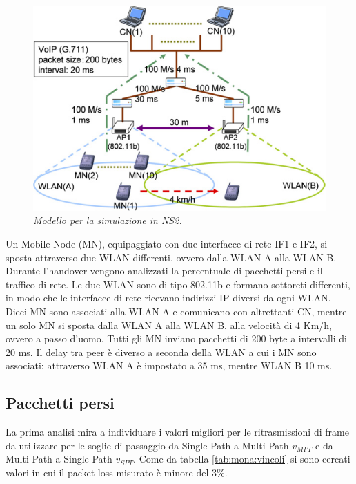 \documentclass[12pt,a4paper,openright,twoside]{book}
\begin{document}
\begin{figure}
  \centering
  \includegraphics[width=\textwidth]{img/mona-qos-sim-model}
  \caption{\em Modello per la simulazione in NS2.}
  \label{fig:mona:qos-sim-model}
\end{figure}

Un Mobile Node (MN), equipaggiato con due interfacce di rete IF1 e
IF2, si sposta attraverso due WLAN differenti, ovvero dalla WLAN A
alla WLAN B. Durante l'handover vengono analizzati la percentuale di
pacchetti persi e il traffico di rete. Le due WLAN sono di tipo
802.11b e formano sottoreti differenti, in modo che le interfacce di
rete ricevano indirizzi IP diversi da ogni WLAN. Dieci MN sono
associati alla WLAN A e comunicano con altrettanti CN, mentre un solo
MN si sposta dalla WLAN A alla WLAN B, alla velocità di 4 Km/h, ovvero
a passo d'uomo. Tutti gli MN inviano pacchetti di 200 byte a
intervalli di 20 ms. Il delay tra peer è diverso a seconda della WLAN
a cui i MN sono associati: attraverso WLAN A è impostato a 35 ms,
mentre WLAN B 10 ms.

\subsection{Pacchetti persi}
\label{sec:mona:sim-packet-loss}

La prima analisi mira a individuare i valori migliori per le
ritrasmissioni di frame da utilizzare per le soglie di passaggio da
Single Path a Multi Path $v_{MPT}$ e da Multi Path a Single Path
$v_{SPT}$. Come da tabella \ref{tab:mona:vincoli} si sono cercati
valori in cui il packet loss misurato è minore del 3\%.
\end{document}

